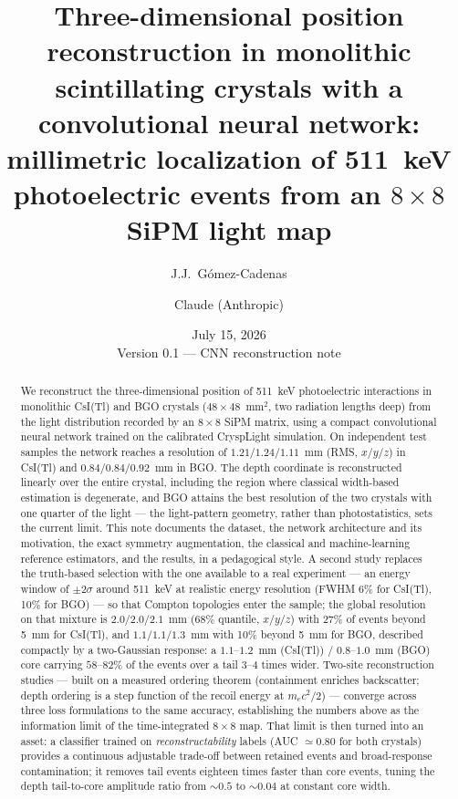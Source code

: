 \documentclass[11pt,a4paper]{article}
\title{Three-dimensional position reconstruction in monolithic scintillating
crystals with a convolutional neural network:\\
\large millimetric localization of 511~keV photoelectric events from an
$8\times8$ SiPM light map}
\author{J.J.~G\'omez-Cadenas \and Claude (Anthropic)}
\date{July 15, 2026 \\[2mm] \small Version 0.1 --- CNN reconstruction note}
\newcommand{\csitl}{CsI(Tl)}
\begin{document}
\maketitle

\begin{abstract}
We reconstruct the three-dimensional position of 511~keV photoelectric
interactions in monolithic \csitl{} and BGO crystals ($48\times48$~mm$^2$,
two radiation lengths deep) from the light distribution recorded by an
$8\times8$ SiPM matrix, using a compact convolutional neural network trained on
the calibrated CryspLight simulation. On independent test samples the network
reaches a resolution of $1.21/1.24/1.11$~mm (RMS, $x/y/z$) in \csitl{} and
$0.84/0.84/0.92$~mm in BGO. The depth coordinate is reconstructed linearly over
the entire crystal, including the region where classical width-based estimation
is degenerate, and BGO attains the best resolution of the two crystals with one
quarter of the light --- the light-pattern geometry, rather than
photostatistics, sets the current limit. This note documents the dataset, the
network architecture and its motivation, the exact symmetry augmentation, the
classical and machine-learning reference estimators, and the results, in a
pedagogical style. A second study replaces the truth-based selection with the
one available to a real experiment --- an energy window of $\pm2\sigma$ around
511~keV at realistic energy resolution (FWHM 6\% for \csitl{}, 10\% for BGO)
--- so that Compton topologies enter the sample; the global resolution on that
mixture is $2.0/2.0/2.1$~mm (68\% quantile, $x/y/z$) with 27\% of events
beyond 5~mm for \csitl{}, and $1.1/1.1/1.3$~mm with 10\% beyond 5~mm for BGO,
described compactly by a two-Gaussian response: a $1.1$--$1.2$~mm
(\csitl{}) / $0.8$--$1.0$~mm (BGO) core carrying $58$--$82\%$ of the events
over a tail $3$--$4$ times wider. Two-site reconstruction studies --- built on
a measured ordering theorem (containment enriches backscatter; depth ordering
is a step function of the recoil energy at $m_ec^2/2$) --- converge across
three loss formulations to the same accuracy, establishing the numbers above
as the information limit of the time-integrated $8\times8$ map. That limit is
then turned into an asset: a classifier trained on \emph{reconstructability}
labels (AUC $\simeq 0.80$ for both crystals) provides a continuous
adjustable trade-off between retained events and broad-response contamination; it removes tail events eighteen times faster
than core events, tuning the depth tail-to-core amplitude ratio from
$\sim$$0.5$ to $\sim$$0.04$ at constant core width.
\end{abstract}
\end{document}
